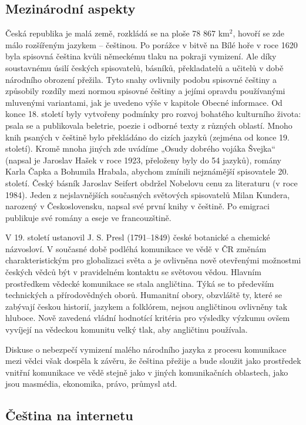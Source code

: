 \begin{multicols}{2}
\subsection{Mezinárodní aspekty}

Česká republika je malá země, rozkládá se na ploše 78 867 km$^{\textrm{2}}$, hovoří se zde málo rozšířeným jazykem – češtinou. Po porážce v bitvě na Bílé hoře v roce 1620 byla spisovná čeština kvůli německému tlaku na pokraji vymizení. Ale díky soustavnému úsilí českých spisovatelů, básníků, překladatelů a učitelů v době národního obrození přežila. Tyto snahy ovlivnily podobu spisovné češtiny a způsobily rozdíly mezi normou spisovné češtiny a jejími opravdu používanými mluvenými variantami, jak je uvedeno výše v kapitole Obecné informace. Od konce 18. století byly vytvořeny podmínky pro rozvoj bohatého kulturního života: psala se a publikovala beletrie, poezie i odborné texty z různých oblastí. Mnoho knih psaných v češtině bylo překládáno do cizích jazyků (zejména od konce 19. století). Kromě mnoha jiných zde uvádíme „Osudy dobrého vojáka Švejka“ (napsal je Jaroslav Hašek v roce 1923, přeloženy byly do 54 jazyků), romány Karla Čapka a Bohumila Hrabala, abychom zmínili nejznámější spisovatele 20. století. Český básník Jaroslav Seifert obdržel Nobelovu cenu za literaturu (v roce 1984). Jeden z nejslavnějších současných světových spisovatelů Milan Kundera, narozený v Československu, napsal své první knihy v češtině. Po emigraci publikuje své romány a eseje ve francouzštině.

V 19. století ustanovil J. S. Presl (1791–1849) české botanické a chemické názvosloví. V současné době podléhá komunikace ve vědě v ČR změnám charakteristickým pro globalizaci světa a je ovlivněna nově otevřenými možnostmi českých vědců být v pravidelném kontaktu se světovou vědou. Hlavním prostředkem vědecké komunikace se stala angličtina. Týká se to především technických a přírodovědných oborů. Humanitní obory, obzvláště ty, které se zabývají českou historií, jazykem a folklórem, nejsou angličtinou ovlivněny tak hluboce. Nově zavedená vládní hodnotící kritéria pro výsledky výzkumu ovšem vyvíjejí na vědeckou komunitu velký tlak, aby angličtinu používala.

Diskuse o nebezpečí vymizení malého národního jazyka z procesu komunikace mezi vědci však dospěla k závěru, že čeština přežije a bude sloužit jako prostředek vnitřní komunikace ve vědě stejně jako v jiných komunikačních oblastech, jako jsou masmédia, ekonomika, právo, průmysl atd.

\subsection{Čeština na internetu}


\end{multicols}
